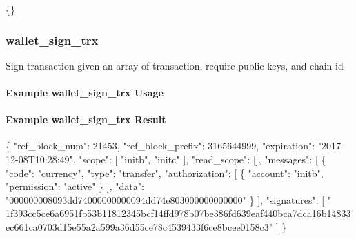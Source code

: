 \begin{DoxyCode}
\{\}
\end{DoxyCode}
\hypertarget{group__aaciorpc_v1walletsigntrx}{}\subsubsection{wallet\+\_\+sign\+\_\+trx}\label{group__aaciorpc_v1walletsigntrx}
Sign transaction given an array of transaction, require public keys, and chain id\hypertarget{group__aaciorpc_examplewalletsigntrx}{}\paragraph{Example wallet\+\_\+sign\+\_\+trx Usage}\label{group__aaciorpc_examplewalletsigntrx}

\hypertarget{group__aaciorpc_examplewalletsigntrxresult}{}\paragraph{Example wallet\+\_\+sign\+\_\+trx Result}\label{group__aaciorpc_examplewalletsigntrxresult}

\begin{DoxyCode}
\{
  \textcolor{stringliteral}{"ref\_block\_num"}: 21453,
  \textcolor{stringliteral}{"ref\_block\_prefix"}: 3165644999,
  \textcolor{stringliteral}{"expiration"}: \textcolor{stringliteral}{"2017-12-08T10:28:49"},
  \textcolor{stringliteral}{"scope"}: [
    \textcolor{stringliteral}{"initb"},
    \textcolor{stringliteral}{"initc"}
  ],
  \textcolor{stringliteral}{"read\_scope"}: [],
  \textcolor{stringliteral}{"messages"}: [
    \{
      \textcolor{stringliteral}{"code"}: \textcolor{stringliteral}{"currency"},
      \textcolor{stringliteral}{"type"}: \textcolor{stringliteral}{"transfer"},
      \textcolor{stringliteral}{"authorization"}: [
        \{
          \textcolor{stringliteral}{"account"}: \textcolor{stringliteral}{"initb"},
          \textcolor{stringliteral}{"permission"}: \textcolor{stringliteral}{"active"}
        \}
      ],
      \textcolor{stringliteral}{"data"}: \textcolor{stringliteral}{"000000008093dd74000000000094dd74e803000000000000"}
    \}
  ],
  \textcolor{stringliteral}{"signatures"}: [
    \textcolor{stringliteral}{"
      1f393cc5ce6a6951fb53b11812345bcf14ffd978b07be386fd639eaf440bca7dca16b14833ec661ca0703d15e55a2a599a36d55ce78c4539433f6ce8bcee0158c3"}
  ]
\}
\end{DoxyCode}
 
